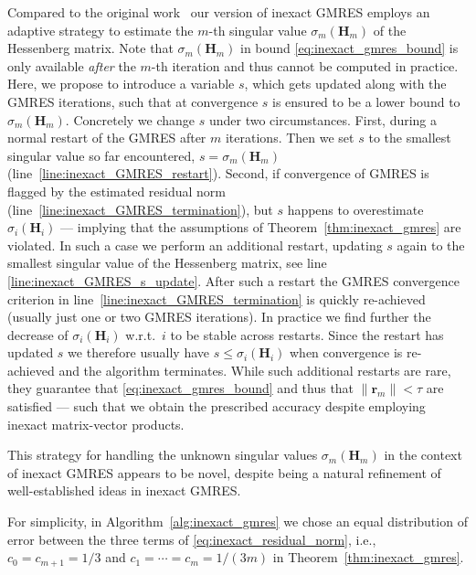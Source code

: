 \documentclass[hidelinks,onefignum,onetabnum]{siamart250211}
\begin{document}
%
Compared to the original work~\cite{simoncini2003theory}
our version of inexact GMRES employs an adaptive strategy
to estimate the $m$-th singular value $\sigma_m(\bm H_m)$ of the Hessenberg matrix.
Note that $\sigma_m(\bm H_m)$ in bound \eqref{eq:inexact_gmres_bound}
is only available \emph{after} the $m$-th iteration
and thus cannot be computed in practice.
Here, we propose to introduce a variable $s$,
which %
gets updated along with the GMRES iterations,
such that at convergence
$s$ is ensured to be a lower bound to $\sigma_m(\bm H_m)$.
Concretely we change $s$ under two circumstances.
First, during a normal restart of the GMRES after $m$ iterations.
Then we set $s$ to the smallest singular value so far encountered,
$s = \sigma_m(\bm H_m)$ (line~\ref{line:inexact_GMRES_restart}).
Second, if convergence of GMRES is flagged by the estimated residual norm
(line~\ref{line:inexact_GMRES_termination}),
but $s$ happens to overestimate $\sigma_i(\bm H_i)$
--- implying that the assumptions of Theorem~\ref{thm:inexact_gmres} are violated.
In such a case we perform an additional restart, updating $s$ again
to the smallest singular value of the Hessenberg matrix,
see line \ref{line:inexact_GMRES_s_update}.
After such a restart the GMRES
convergence criterion in line~\ref{line:inexact_GMRES_termination}
is quickly re-achieved (usually just one or two GMRES iterations).
In practice we find further the decrease of $\sigma_i(\bm H_i)$
w.r.t.~$i$ to be stable across restarts.
Since the restart has updated $s$ we therefore usually have $s \leq \sigma_i(\bm H_i)$
when convergence is re-achieved and  the algorithm terminates.
While such additional restarts are rare,
they guarantee that \eqref{eq:inexact_gmres_bound}
and thus that $\| \bm r_m \| < \tau$ are satisfied
--- such that we obtain the prescribed accuracy
despite employing inexact matrix-vector products.

This strategy for handling the unknown singular values
$\sigma_m(\bm H_m)$ in the context of inexact GMRES appears to be novel,
despite being a natural refinement of well-established ideas in inexact GMRES.

\begin{remark}\label{rem:other_distributions}
  For simplicity, in Algorithm~\ref{alg:inexact_gmres} we chose an equal 
  distribution of error between the three 
  terms of \eqref{eq:inexact_residual_norm}, i.e., 
   $c_0 = c_{m+1} = 1/3$ and 
   $c_1 = \cdots = c_{m} = 1/(3m)$ in Theorem~\ref{thm:inexact_gmres}.
\end{remark}
\end{document}
